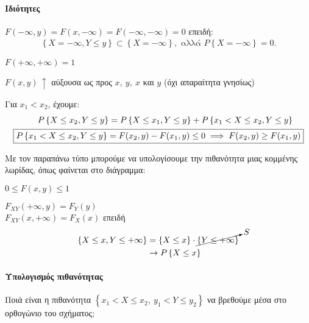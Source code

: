 \documentclass[11pt,a4paper,notitlepage,fleqn,final]{article}
\begin{document}
	\paragraph{Ιδιότητες}
	\begin{enumroman}
		\item \( F(-\infty,y) = F(x,-\infty) = F(-\infty,-\infty) 
		= 0 \)
		επειδή:
		\begin{gather*}
			\left\lbrace X=-\infty, Y \leq y \right\rbrace
			\subset \left\lbrace X=-\infty \right\rbrace, \text{ αλλά }
			P\left\lbrace X=-\infty \right\rbrace = 0.
		\end{gather*}
		
		\item \( F(+\infty,+\infty) = 1 \)
		\item \( F(x,y) \, \uparrow \) αύξουσα ως προς \( x,\ y,\ x \)
		και \( y \) (όχι απαραίτητα γνησίως)
		
		Για \( x_1<x_2 \), έχουμε:
		\begin{align*}
			P\left\lbrace X\leq x_2,Y\leq y \right\rbrace
			&= P\left\lbrace X\leq x_1, Y \leq y \right\rbrace
			+ P\left\lbrace x_1<X\leq x_2,Y \leq y \right\rbrace\\
			\Aboxed{P\left\lbrace x_1<X\leq x_2,Y\leq y \right\rbrace
			&= F(x_2,y)  - F(x_1,y) \leq 0 \implies F(x_2,y)\geq 
			F(x_1,y)}
		\end{align*}
		
		Με τον παραπάνω τύπο μπορούμε να υπολογίσουμε την πιθανότητα
		μιας κομμένης λωρίδας, όπως φαίνεται στο διάγραμμα:
		
		\item \( 0 \leq F(x,y) \leq 1 \)
		\item \( F_{XY}(+\infty,y) = F_Y(y) \) \\
		\( F_{XY}(x,+\infty) = F_X(x) \) επειδή
		\begin{align*}
			\left\lbrace X\leq x, Y \leq +\infty \right\rbrace &=
			\left\lbrace X\leq x \right\rbrace\cdot
			\cancelto{S}{\left\lbrace Y \leq +\infty \right\rbrace}
			\\ &\rightarrow P\left\lbrace X\leq x \right\rbrace
		\end{align*}
	\end{enumroman}
	
	\paragraph{Υπολογισμός πιθανότητας}
	Ποιά είναι η πιθανότητα
	\( \left\lbrace x_1<X\leq x_2,\
	y_1<Y\leq y_2 \right\rbrace \)
	να βρεθούμε μέσα στο ορθογώνιο του σχήματος;
	
\end{document}

